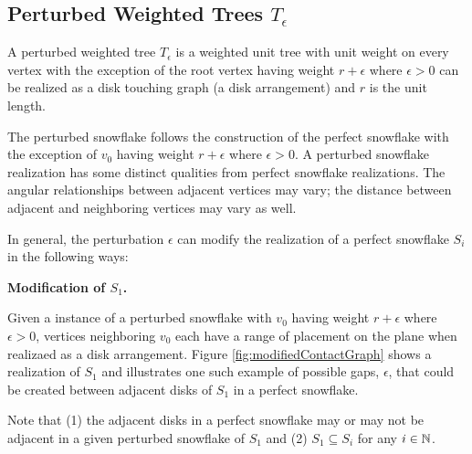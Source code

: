 
\subsection{Perturbed Weighted Trees $T_\epsilon$}

A perturbed weighted tree $T_\epsilon$ is a weighted unit tree with unit weight on every vertex with the exception of the root vertex having weight $r+\epsilon$ where $\epsilon>0$ can be realized as a disk touching graph (a disk arrangement) and $r$ is the unit length.  

The perturbed snowflake follows the construction of the perfect snowflake with the exception of $v_0$ having weight $r+ \epsilon$ where $\epsilon > 0$.
A perturbed snowflake realization has some distinct qualities from perfect snowflake realizations.  
The angular relationships between adjacent vertices may vary; the distance between adjacent and neighboring vertices may vary as well.


In general, the perturbation $\epsilon$ can modify the realization of a perfect snowflake $S_i$ in the following ways:

\textbf{Modification of $S_1$.} 

Given a instance of a perturbed snowflake with $v_0$ having weight $r + \epsilon$ where $\epsilon > 0$, vertices neighboring $v_0$ each have a range of placement on the plane when realizaed as a disk arrangement. 
Figure \ref{fig:modifiedContactGraph} shows a realization of $S_1$ and illustrates one such example of possible gaps, $\epsilon$, that could be created between adjacent disks of $S_1$ in a perfect snowflake.  

Note that (1) the adjacent disks in a perfect snowflake may or may not be adjacent in a given perturbed snowflake of $S_1$ and (2) $S_1 \subseteq S_i$ for any $i \in {\mathbb{N}}$.  